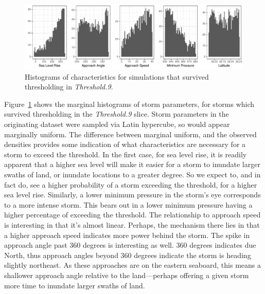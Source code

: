 \begin{figure}[htb]
    \centering 
    \caption{Histograms of characteristics for simulations 
        that survived thresholding in \emph{Threshold.9}.\label{fig:thetahistogram}}
    \includegraphics[width=0.9\linewidth]{plots/threshold_histogram}
\end{figure}

Figure~\ref{fig:thetahistogram} shows the marginal histograms of storm parameters, for 
    storms which survived thresholding in the \emph{Threshold.9} slice.  Storm parameters in 
    the originating dataset were sampled via Latin hypercube, so would appear marginally
    uniform.  The difference between marginal uniform, and the observed densities provides
    some indication of what characteristics are necessary for a storm to exceed the threshold.
    In the first case, for sea level rise, it is readily apparent that a higher sea level will
    make it easier for a storm to inundate larger swaths of land, or inundate locations to a
    greater degree.  So we expect to, and in fact do, see a higher probability of a storm exceeding
    the threshold, for a higher sea level rise.  Similarly, a lower minimum pressure in the storm's
    eye corresponds to a more intense storm.  This bears out in a lower minimum pressure having
    a higher percentage of exceeding the threshold.  The relationship to approach speed is 
    interesting in that it's almost linear.  Perhaps, the mechanism there lies in that a higher
    approach speed indicates more power behind the storm.  The spike in approach angle past 360
    degrees is interesting as well. 360 degrees indicates due North, thus approach angles 
    beyond 360 degrees indicate the storm is heading slightly northeast. As these approaches are
    on the eastern seaboard, this means a shallower approach angle relative to the
    land---perhaps offering a given storm more time to inundate larger swaths of land.

